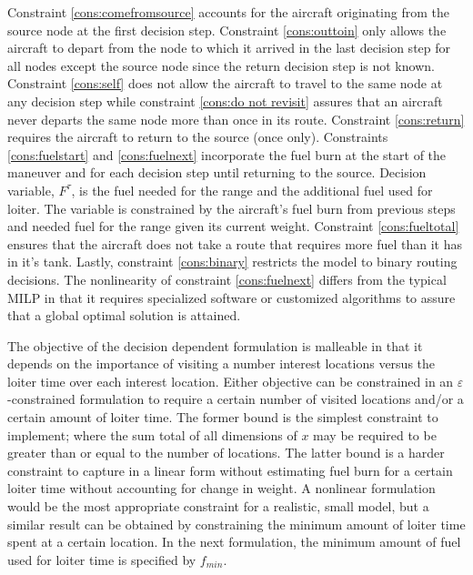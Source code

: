 Constraint \eqref{cons:comefromsource} accounts for the aircraft originating from the source node at the first decision step. Constraint \eqref{cons:outtoin} only allows the aircraft to depart from the node to which it arrived in the last decision step for all nodes except the source node since the return decision step is not known. Constraint \eqref{cons:self} does not allow the aircraft to travel to the same node at any decision step while constraint \eqref{cons:do not revisit} assures that an aircraft never departs the same node more than once in its route.  Constraint \eqref{cons:return} requires the aircraft to return to the source (once only). Constraints \eqref{cons:fuelstart} and \eqref{cons:fuelnext} incorporate the fuel burn at the start of the maneuver and for each decision step until returning to the source. Decision variable, $F^{\tau}$, is the fuel needed for the range and the additional fuel used for loiter. The variable is constrained by the aircraft's fuel burn from previous steps and needed fuel for the range given its current weight. Constraint \eqref{cons:fueltotal} ensures that the aircraft does not take a route that requires more fuel than it has in it's tank. Lastly, constraint \eqref{cons:binary} restricts the model to binary routing decisions. The nonlinearity of constraint \eqref{cons:fuelnext} differs from the typical MILP in that it requires specialized software or customized algorithms to assure that a global optimal solution is attained.\par
The objective of the decision dependent formulation is malleable in that it depends on the importance of visiting a number interest locations versus the loiter time over each interest location. Either objective can be constrained in an $\varepsilon$-constrained formulation to require a certain number of visited locations and/or a certain amount of loiter time. The former bound is the simplest constraint to implement; where the sum total of all dimensions of $x$ may be required to be greater than or equal to the number of locations. The latter bound is a harder constraint to capture in a linear form without estimating fuel burn for a certain loiter time without accounting for change in weight. A nonlinear formulation would be the most appropriate constraint for a realistic, small model, but a similar result can be obtained by constraining the minimum amount of loiter time spent at a certain location. In the next formulation, the minimum amount of fuel used for loiter time is specified by $f_{min}$.

